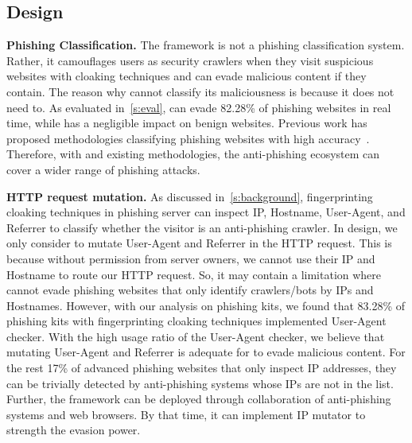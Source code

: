 \subsection{\spartacus Design}

\noindent
\textbf{Phishing Classification.}
The \spartacus framework is not a phishing classification system.
Rather, it camouflages users as security crawlers when they visit suspicious websites with cloaking techniques and can evade malicious content if they contain.
The reason why \spartacus cannot classify its maliciousness is because it does not need to.
As evaluated in~\autoref{s:eval}, \spartacus can evade 82.28\% of phishing websites in real time, while has a negligible impact on benign websites.
Previous work has proposed methodologies classifying phishing websites with high accuracy~\cite{whittaker2010large, lin2021phishpedia}.
Therefore, with \spartacus and existing methodologies, the anti-phishing ecosystem can cover a wider range of phishing attacks.


\noindent
\textbf{HTTP request mutation.}
As discussed in~\autoref{s:background}, fingerprinting cloaking techniques in phishing server can inspect IP, Hostname, User-Agent, and Referrer to classify whether the visitor is an anti-phishing crawler.
In \spartacus design, we only consider to mutate User-Agent and Referrer in the HTTP request.
This is because without permission from server owners, we cannot use their IP and Hostname to route our HTTP request.
So, it may contain a limitation where \spartacus cannot evade phishing websites that only identify crawlers/bots by IPs and Hostnames.
However, with our analysis on phishing kits, we found that 83.28\% of phishing kits with fingerprinting cloaking techniques implemented User-Agent checker.
With the high usage ratio of the User-Agent checker, we believe that mutating User-Agent and Referrer is adequate for \spartacus to evade malicious content.
For the rest 17\% of advanced phishing websites that only inspect IP addresses, they can be trivially detected by anti-phishing systems whose IPs are not in the list.
Further, the \spartacus framework can be deployed through collaboration of anti-phishing systems and web browsers.
By that time, it can implement IP mutator to strength the evasion power.

